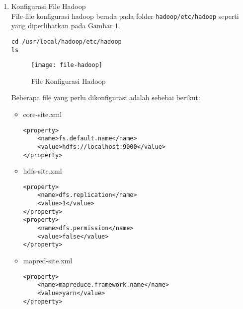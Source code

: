 \documentclass[a4paper]{tufte-handout}
\begin{document}
\begin{enumerate}
\item Konfigurasi File Hadoop \\
File-file konfigurasi hadoop berada pada folder {\tt hadoop/etc/hadoop} seperti yang diperlihatkan pada Gambar \ref{gam:file-hadoop}.

{\tt cd /usr/local/hadoop/etc/hadoop} \\
{\tt ls}

\begin{figure}[!ht]
\texttt{[image: file-hadoop]}
\caption{File Konfigurasi Hadoop}
\label{gam:file-hadoop}
\end{figure}

Beberapa file yang perlu dikonfigurasi adalah sebebai berikut:
\begin{itemize}

\item core-site.xml
\begin{lstlisting}
<property>
	<name>fs.default.name</name>
	<value>hdfs://localhost:9000</value>
</property>
\end{lstlisting}


\item hdfs-site.xml
\begin{lstlisting}
<property>
	<name>dfs.replication</name>
	<value>1</value>
</property>
<property>
	<name>dfs.permission</name>
	<value>false</value>
</property>
\end{lstlisting}


\item mapred-site.xml
\begin{lstlisting}
<property>
	<name>mapreduce.framework.name</name>
	<value>yarn</value>
</property>
\end{lstlisting}



\end{itemize}
\end{enumerate}
\end{document}

